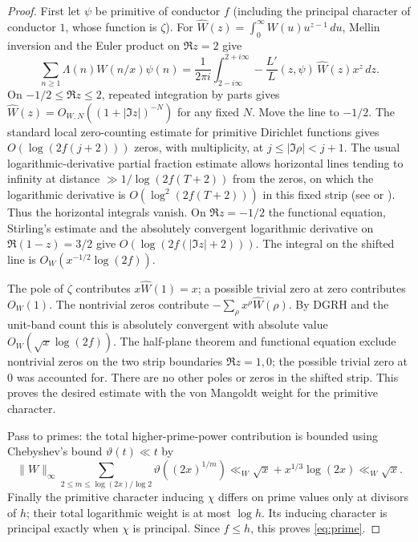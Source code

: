 \documentclass[11pt]{article}
\theoremstyle{definition}\newtheorem{remark}[theorem]{Remark}
\newcommand{\norm}[1]{\lVert #1\rVert}
\newcommand{\GRH}{\textup{DGRH}}
\begin{document}
\begin{proof}
First let $\psi$ be primitive of conductor $f$ (including the principal character of conductor $1$, whose function is $\zeta$). For $\widehat W(z)=\int_0^\infty W(u)u^{z-1}\,du$, Mellin inversion and the Euler product on $\Re z=2$ give
\[
 \sum_{n\ge1}\Lambda(n)W(n/x)\psi(n)
 =\frac1{2\pi i}\int_{2-i\infty}^{2+i\infty}
       -\frac{L'}{L}(z,\psi)\,\widehat W(z)x^z\,dz.
\]
On $-1/2\le\Re z\le2$, repeated integration by parts gives $\widehat W(z)=O_{W,N}((1+|\Im z|)^{-N})$ for any fixed $N$. Move the line to $-1/2$. The standard local zero-counting estimate for primitive Dirichlet functions gives $O(\log(2f(j+2)))$ zeros, with multiplicity, at $j\le |\Im\rho|<j+1$. The usual logarithmic-derivative partial fraction estimate allows horizontal lines tending to infinity at distance $\gg1/\log(2f(T+2))$ from the zeros, on which the logarithmic derivative is $O(\log^2(2f(T+2)))$ in this fixed strip (see \cite[Chs. 12--14]{MV} or \cite{Davenport}). Thus the horizontal integrals vanish. On $\Re z=-1/2$ the functional equation, Stirling's estimate and the absolutely convergent logarithmic derivative on $\Re(1-z)=3/2$ give $O(\log(2f(|\Im z|+2)))$. The integral on the shifted line is $O_W(x^{-1/2}\log(2f))$.

The pole of $\zeta$ contributes $x\widehat W(1)=x$; a possible trivial zero at zero contributes $O_W(1)$. The nontrivial zeros contribute $-\sum_\rho x^\rho\widehat W(\rho)$. By \GRH{} and the unit-band count this is absolutely convergent with absolute value $O_W(\sqrt x\log(2f))$. The half-plane theorem and functional equation exclude nontrivial zeros on the two strip boundaries $\Re z=1,0$; the possible trivial zero at $0$ was accounted for. There are no other poles or zeros in the shifted strip. This proves the desired estimate with the von Mangoldt weight for the primitive character.

Pass to primes: the total higher-prime-power contribution is bounded using Chebyshev's bound $\vartheta(t)\ll t$ by
\[
 \norm W_\infty\sum_{2\le m\le\log(2x)/\log2}\vartheta((2x)^{1/m})
 \ll_W \sqrt x+x^{1/3}\log(2x)\ll_W\sqrt x.
\]
Finally the primitive character inducing $\chi$ differs on prime values only at divisors of $h$; their total logarithmic weight is at most $\log h$. Its inducing character is principal exactly when $\chi$ is principal. Since $f\le h$, this proves \eqref{eq:prime}.
\end{proof}
\end{document}
